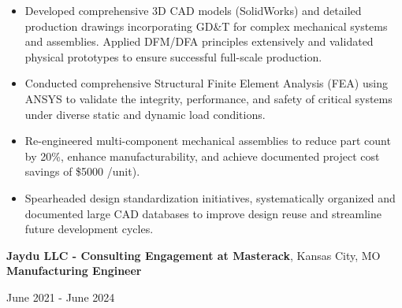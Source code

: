 \documentclass[11pt, letterpaper]{article}
\begin{document}
\begin{itemize}[leftmargin=*, label=\textbullet]
\setlength\itemsep{-2pt}
\vspace{-8pt}
\item Developed comprehensive 3D CAD models (SolidWorks) and detailed production drawings incorporating GD\&T for complex mechanical systems and assemblies. Applied DFM/DFA principles extensively and validated physical prototypes to ensure successful full-scale production.
\item Conducted comprehensive Structural Finite Element Analysis (FEA) using ANSYS to validate the integrity, performance, and safety of critical systems under diverse static and dynamic load conditions. 
\item Re-engineered multi-component mechanical assemblies to reduce part count by 20\%, enhance manufacturability, and achieve documented project cost savings of \$5000 /unit).
\item Spearheaded design standardization initiatives, systematically organized and documented large CAD databases to improve design reuse and streamline future development cycles.
\end{itemize}\vspace{-8pt}
\vspace{4pt}
\textbf{Jaydu LLC - Consulting Engagement at Masterack}, Kansas City, MO\\
\textbf{Manufacturing Engineer}\hfill \raggedright{June 2021 - June 2024}\\ %
\end{document}
